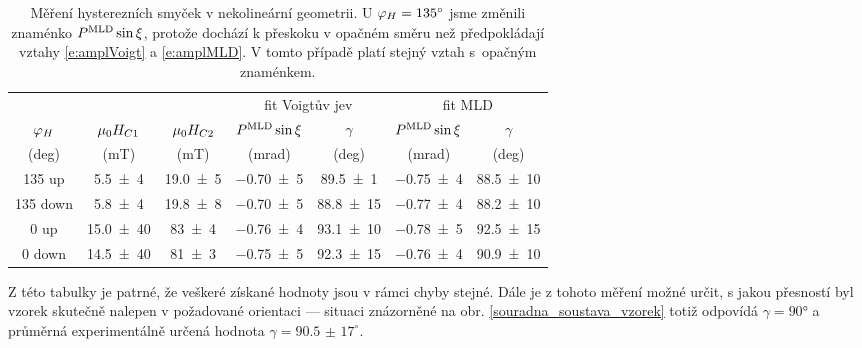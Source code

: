 \begin{table}[htbp]	
	\centering	
	\begin{tabular}{c||cc|cc|cc}
		& & & \multicolumn{2}{c|}{fit Voigtův jev} & \multicolumn{2}{c}{fit MLD} \\
		$\varphi_H$ & $\mu_0H_{C1}$ & $\mu_0H_{C2}$ & $P^{\text{MLD}} \sin\xi$ & $\gamma$ & $P^{\text{MLD}} \sin\xi$ & $\gamma$ \\
		(deg) & (mT) & (mT) & (\si{\milli\radian}) & (deg) & (\si{\milli\radian}) & (deg) \\ \hline
		135 up & \num{5,5(4)} & \num{19,0(5)} & \num{-0,70(5)} & \num{89.5(10)} & \num{-0,75(4)} & \num{88,5(10)} \\
		135 down & \num{5,8(4)} & \num{19,8(8)} & \num{-0,70(5)} & \num{88,8(15)} & \num{-0,77(4)} & \num{88,2(10)} \\ \hline
		0 up & \num{15,0(40)} & \num{83(4)} & \num{-0,76(4)} & \num{93,1(10)}& \num{-0,78(5)} & \num{92,5(15)} \\
		0 down & \num{14,5(40)} & \num{81(3)} & \num{-0,75(5)} & \num{92,3(15)} & \num{-0,76(4)}& \num{90,9(10)} \\
	\end{tabular}
	\caption{Měření hysterezních smyček v nekolineární geometrii. U $\varphi_H=\ang{135}$ jsme změnili znaménko $P^{\text{MLD}} \sin\xi$, protože dochází k přeskoku v opačném směru než předpokládají vztahy \eqref{e:amplVoigt} a \eqref{e:amplMLD}. V tomto případě platí stejný vztah s~opačným znaménkem.}
	\label{tab_nekol_hyst}
\end{table}

Z této tabulky je patrné, že veškeré získané hodnoty jsou v rámci chyby stejné. Dále je z tohoto měření možné určit, s jakou přesností byl vzorek skutečně nalepen v požadované orientaci --- situaci znázorněné na obr. \ref{souradna_soustava_vzorek} totiž odpovídá $\gamma=\ang{90}$ a průměrná experimentálně určená hodnota $\gamma=\num{90,5(17)}^\circ$.


\FloatBarrier
